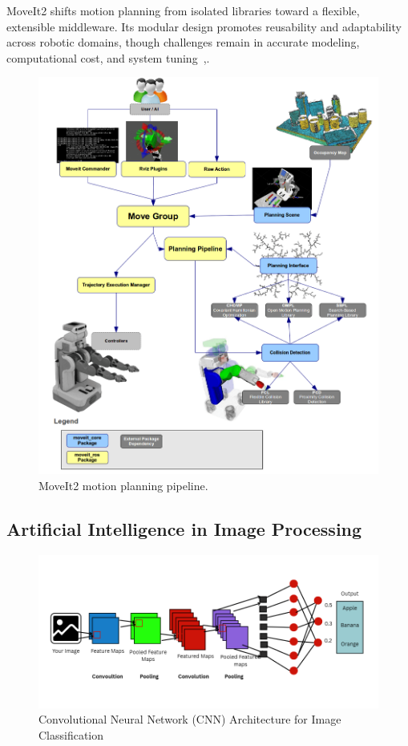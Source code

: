\documentclass[12pt]{extarticle}
\begin{document}
MoveIt2 shifts motion planning from isolated libraries toward a flexible, extensible middleware. Its modular design promotes reusability and adaptability across robotic domains, though challenges remain in accurate modeling, computational cost, and system tuning~\cite{moveit-doc},\cite{moveit2}.

\begin{figure}[htbp]
    \centering
    \includegraphics[width=\linewidth]{images/moveit_pipeline.png}
    \caption{MoveIt2 motion planning pipeline.}
    \label{fig:moveit_pipeline}
\end{figure}

\subsection{Artificial Intelligence in Image Processing}

\begin{figure}[htbp]
    \centering
    \includegraphics[width=0.8\linewidth]{images/CNN.png}
    \caption{Convolutional Neural Network (CNN) Architecture for Image Classification}
    \label{fig:cnn}
\end{figure}
\end{document}
